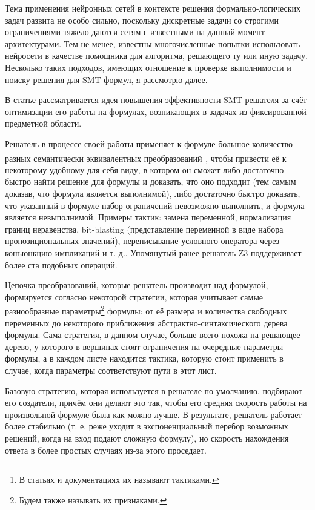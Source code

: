 
Тема применения нейронных сетей в контексте решения формально-логических задач развита не особо сильно, поскольку дискретные задачи со строгими ограничениями тяжело даются сетям с известными на данный момент архитектурами. Тем не менее, известны многочисленные попытки использовать нейросети в качестве помощника для алгоритма, решающего ту или иную задачу. Несколько таких подходов, имеющих отношение к проверке выполнимости и поиску решения для SMT-формул, я рассмотрю далее.


В статье \cite{fastsmt-paper} рассматривается идея повышения эффективности SMT-решателя за счёт оптимизации его работы на формулах, возникающих в задачах из фиксированной предметной области.

Решатель в процессе своей работы применяет к формуле большое количество разных семантически эквивалентных преобразований\footnote{В статьях и документациях их называют тактиками.}, чтобы привести её к некоторому удобному для себя виду, в котором он сможет либо достаточно быстро найти решение для формулы и доказать, что оно подходит (тем самым доказав, что формула является выполнимой), либо достаточно быстро доказать, что указанный в формуле набор ограничений невозможно выполнить, и формула является невыполнимой. Примеры тактик: замена переменной, нормализация границ неравенства, bit-blasting (представление переменной в виде набора пропозициональных значений), переписывание условного оператора через конъюнкцию импликаций и т. д.. Упомянутый ранее решатель Z3 \cite{z3-paper} поддерживает более ста подобных операций.

Цепочка преобразований, которые решатель производит над формулой, формируется согласно некоторой стратегии, которая учитывает самые разнообразные параметры\footnote{Будем также называть их признаками.} формулы: от её размера и количества свободных переменных до некоторого приближения абстрактно-синтаксического дерева формулы. Сама стратегия, в данном случае, больше всего похожа на решающее дерево, у которого в вершинах стоят ограничения на очередные параметры формулы, а в каждом листе находится тактика, которую стоит применить в случае, когда параметры соответствуют пути в этот лист.

Базовую стратегию, которая используется в решателе по-умолчанию, подбирают его создатели, причём они делают это так, чтобы его средняя скорость работы на произвольной формуле была как можно лучше. В результате, решатель работает более стабильно (т. е. реже уходит в экспоненциальный перебор возможных решений, когда на вход подают сложную формулу), но скорость нахождения ответа в более простых случаях из-за этого проседает.

